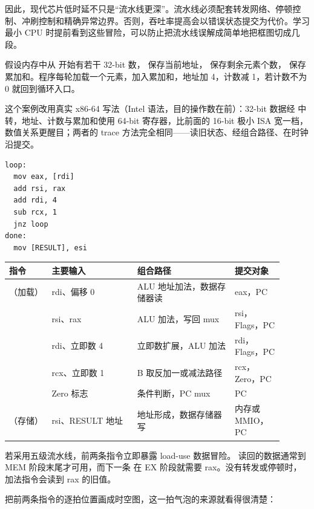 因此，现代芯片低时延不只是“流水线更深”。流水线必须配套转发网络、停顿控制、冲刷控制和精确异常边界。否则，吞吐率提高会以错误状态提交为代价。学习最小 CPU 时提前看到这些冒险，可以防止把流水线误解成简单地把框图切成几段。

假设内存中从  开始有若干 32-bit 数， 保存当前地址， 保存剩余元素个数， 保存累加和。程序每轮加载一个元素，加入累加和，地址加 4，计数减 1，若计数不为 0 就回到循环入口。

这个案例改用真实 x86-64 写法（Intel 语法，目的操作数在前）：32-bit 数据经  中转，地址、计数与累加和使用 64-bit 寄存器，比前面的 16-bit 极小 ISA 宽一档，数值关系更醒目；两者的 trace 方法完全相同——读旧状态、经组合路径、在时钟沿提交。

\begin{lstlisting}
loop:
  mov eax, [rdi]
  add rsi, rax
  add rdi, 4
  sub rcx, 1
  jnz loop
done:
  mov [RESULT], esi
\end{lstlisting}

\begin{longtable}{L{0.14\linewidth}L{0.28\linewidth}L{0.32\linewidth}L{0.16\linewidth}}
\toprule
指令 & 主要输入 & 组合路径 & 提交对象 \\
\midrule
{}（加载） & rdi、偏移 0 & ALU 地址加法，数据存储器读 & eax，PC \\\tablerowrule
{} & rsi、rax & ALU 加法，写回 mux & rsi，Flags，PC \\\tablerowrule
{} & rdi、立即数 4 & 立即数扩展，ALU 加法 & rdi，Flags，PC \\\tablerowrule
{} & rcx、立即数 1 & B 取反加一或减法路径 & rcx，Zero，PC \\\tablerowrule
{} & Zero 标志 & 条件判断，PC mux & PC \\\tablerowrule
{}（存储） & rsi、RESULT 地址 & 地址形成，数据存储器写 & 内存或 MMIO，PC \\
\bottomrule
\end{longtable}

若采用五级流水线，前两条指令立即暴露 load-use 数据冒险。 读回的数据通常到 MEM 阶段末尾才可用，而下一条  在 EX 阶段就需要 rax。没有转发或停顿时，加法指令会读到 rax 的旧值。

把前两条指令的逐拍位置画成时空图，这一拍气泡的来源就看得很清楚：

